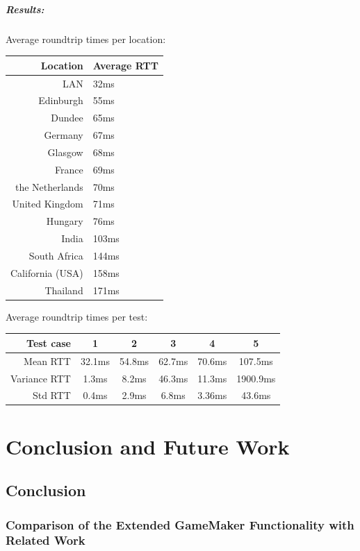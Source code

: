 \documentclass[bsc,frontabs,twoside,singlespacing,parskip,deptreport]{infthesis}     %
\begin{document}
\paragraph*{Results:}Average roundtrip times per location:
\begin{center}
  \begin{tabular}{ r | l }
Location		& Average RTT \\ \hline\hline
LAN				& 32ms	\\
Edinburgh		& 55ms	\\
Dundee			& 65ms	\\
Germany			& 67ms	\\
Glasgow			& 68ms	\\
France			& 69ms	\\
the Netherlands	& 70ms	\\
United Kingdom	& 71ms	\\
Hungary			& 76ms	\\
India			& 103ms	\\
South Africa	& 144ms	\\
California (USA)& 158ms	\\
Thailand		& 171ms	\\
  \end{tabular}
\end{center}

Average roundtrip times per test:
\begin{center}
  \begin{tabular}{ | r || c | c | c | c | c |}
    \hline
    Test case 		& 1 		& 2 		& 3 		& 4 		& 5 		\\ \hline\hline
    Mean RTT 		& 32.1ms 	& 54.8ms 	& 62.7ms 	& 70.6ms 	& 107.5ms	\\ \hline
    Variance RTT 	& 1.3ms 	& 8.2ms 	& 46.3ms 	& 11.3ms 	& 1900.9ms	\\ \hline
    Std RTT			& 0.4ms		& 2.9ms		& 6.8ms		& 3.36ms	& 43.6ms	\\ \hline
  \end{tabular}
\end{center}



\chapter{Conclusion and Future Work}
\section{Conclusion}
\subsection{Comparison of the Extended GameMaker Functionality with Related Work}
\end{document}
